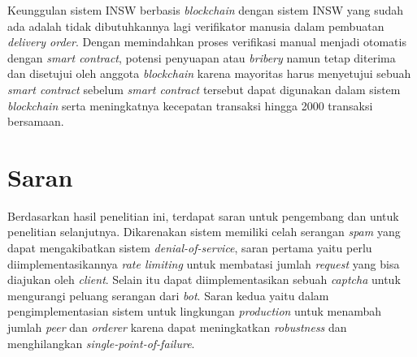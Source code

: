 Keunggulan sistem INSW berbasis \textit{blockchain} dengan sistem INSW yang sudah ada adalah tidak dibutuhkannya lagi verifikator manusia dalam pembuatan \textit{delivery order}. Dengan memindahkan proses verifikasi manual menjadi otomatis dengan \textit{smart contract}, potensi penyuapan atau \textit{bribery} namun tetap diterima dan disetujui oleh anggota \textit{blockchain} karena mayoritas harus menyetujui sebuah \textit{smart contract} sebelum \textit{smart contract} tersebut dapat digunakan dalam sistem \textit{blockchain} serta meningkatnya kecepatan transaksi hingga 2000 transaksi bersamaan.

\section{Saran}
\label{sec:saran}
Berdasarkan hasil penelitian ini, terdapat saran untuk pengembang dan untuk penelitian selanjutnya. Dikarenakan sistem memiliki celah serangan \textit{spam} yang dapat mengakibatkan sistem \textit{denial-of-service}, saran pertama yaitu perlu diimplementasikannya \textit{rate limiting} untuk membatasi jumlah \textit{request} yang bisa diajukan oleh \textit{client}. Selain itu dapat diimplementasikan sebuah \textit{captcha} untuk mengurangi peluang serangan dari \textit{bot}. Saran kedua yaitu dalam pengimplementasian sistem untuk lingkungan \textit{production} untuk menambah jumlah \textit{peer} dan \textit{orderer} karena dapat meningkatkan \textit{robustness} dan menghilangkan \textit{single-point-of-failure}.
